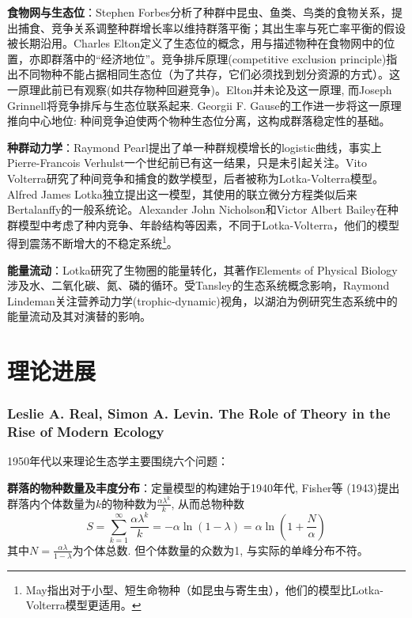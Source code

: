 \textbf{食物网与生态位}：Stephen Forbes分析了种群中昆虫、鱼类、鸟类的食物关系，提出捕食、竞争关系调整种群增长率以维持群落平衡；其出生率与死亡率平衡的假设被长期沿用。Charles Elton定义了生态位的概念，用与描述物种在食物网中的位置，亦即群落中的“经济地位”。竞争排斥原理(competitive exclusion principle)指出不同物种不能占据相同生态位（为了共存，它们必须找到划分资源的方式）。这一原理此前已有观察(如共存物种回避竞争)。Elton并未论及这一原理, 而Joseph Grinnell将竞争排斥与生态位联系起来. Georgii F. Gause的工作进一步将这一原理推向中心地位: 种间竞争迫使两个物种生态位分离，这构成群落稳定性的基础。

\textbf{种群动力学}：Raymond Pearl提出了单一种群规模增长的logistic曲线，事实上Pierre-Francois Verhulst一个世纪前已有这一结果，只是未引起关注。Vito Volterra研究了种间竞争和捕食的数学模型，后者被称为Lotka-Volterra模型。Alfred James Lotka独立提出这一模型，其使用的联立微分方程类似后来Bertalanffy的一般系统论。Alexander John Nicholson和Victor Albert Bailey在种群模型中考虑了种内竞争、年龄结构等因素，不同于Lotka-Volterra，他们的模型得到震荡不断增大的不稳定系统\footnote{May指出对于小型、短生命物种（如昆虫与寄生虫），他们的模型比Lotka-Volterra模型更适用。}。

\textbf{能量流动}：Lotka研究了生物圈的能量转化，其著作Elements of Physical Biology涉及水、二氧化碳、氮、磷的循环。受Tansley的生态系统概念影响，Raymond Lindeman关注营养动力学(trophic-dynamic)视角，以湖泊为例研究生态系统中的能量流动及其对演替的影响。

\section{理论进展}

\subsubsection*{Leslie A. Real, Simon A. Levin. The Role of Theory in the Rise of Modern Ecology}

1950年代以来理论生态学主要围绕六个问题：

\textbf{群落的物种数量及丰度分布}：定量模型的构建始于1940年代, Fisher等 (1943)提出群落内个体数量为$k$的物种数为$\frac{\alpha \lambda^k}{k}$, 从而总物种数
\begin{equation}
    S = \sum_{k=1}^\infty \frac{\alpha \lambda^k}{k} = -\alpha \ln(1-\lambda)=\alpha \ln(1+\frac{N}{\alpha})
\end{equation}
其中$N=\frac{\alpha\lambda}{1-\lambda}$为个体总数. 但个体数量的众数为1, 与实际的单峰分布不符。

